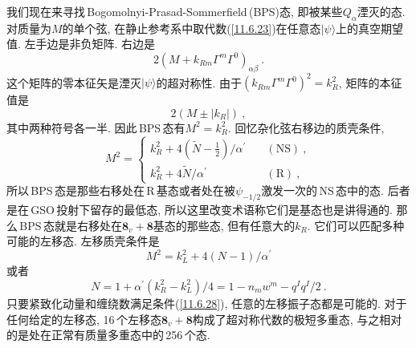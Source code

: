 我们现在来寻找\,Bogomolnyi-Prasad-Sommerfield\,(BPS)态, 即被某些$ Q_{\alpha} $湮灭的态. 对质量为$ M $的单个弦, 在静止参考系中取代数(\ref{11.6.23})在任意态$ \lvert \psi\rangle $上的真空期望值. 左手边是非负矩阵. 右边是
\begin{equation}
    2(M+k_{Rm}\Gamma^{m}\Gamma^{0})_{\alpha\beta} \:. \label{11.6.24}
\end{equation}
这个矩阵的零本征矢是湮灭$ \lvert\psi\rangle $的超对称性. 由于$ (k_{Rm}\Gamma^{m}\Gamma^{0})^{2}=k_{R}^{2}$, 矩阵的本征值是
\begin{equation}
    2(M\pm\lvert k_{R}\rvert) \:, \label{11.6.25}
\end{equation}
其中两种符号各一半. 因此\,BPS\,态有$ M^{2}=k_{R}^{2}$. 回忆杂化弦右移边的质壳条件,
\begin{equation}
    M^{2} = \begin{cases}
        k_{R}^{2}+4(\tilde{N}-\tfrac{1}{2})/\alpha^{\prime} & \quad(\text{NS})\:, \\
        k_{R}^{2}+4\tilde{N}/\alpha^{\prime} &\quad (\text{R})\:,
    \end{cases} \label{11.6.26}
\end{equation}
所以\,BPS\,态是那些右移处在\,R\,基态或者处在被$ \psi_{-1/2} $激发一次的\,NS\,态中的态. 后者是在\,GSO\,投射下留存的最低态, 所以这里改变术语称它们是基态也是讲得通的. 那么\,BPS\,态就是右移处在$ \mathbf{8}_{v}+\mathbf{8} $基态的那些态, 但有任意大的$ k_{R}$. 它们可以匹配多种可能的左移态. 左移质壳条件是
\begin{equation}
    M^{2}=k_{L}^{2}+4(N-1)/\alpha^{\prime} \label{11.6.27}
\end{equation}
或者
\begin{equation}
    N=1+\alpha^{\prime}(k_{R}^{2}-k_{L}^{2})/4=1-n_{m}w^{m}-q^{I}q^{I}/2 \:. \label{11.6.28}
\end{equation}
只要紧致化动量和缠绕数满足条件(\ref{11.6.28}), 任意的左移振子态都是可能的. 对于任何给定的左移态, 16\,个左移态$ \mathbf{8}_{v}+\mathbf{8} $构成了超对称代数的极短多重态, 与之相对的是处在正常有质量多重态中的\,256\,个态.

